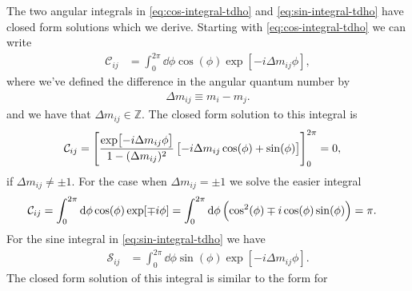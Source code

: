             The two angular integrals in \autoref{eq:cos-integral-tdho} and
            \autoref{eq:sin-integral-tdho} have closed form solutions which we
            derive.
            Starting with \autoref{eq:cos-integral-tdho} we can write
            \begin{align}
                \mathcal{C}_{ij}
                &=
                \int_{0}^{2\pi}
                \dd \phi
                \cos(\phi)
                \exp[-i\Delta m_{ij} \phi],
            \end{align}
            where we've defined the difference in the angular quantum number by
            \begin{align}
                \Delta m_{ij} \equiv m_i - m_j.
            \end{align}
            and we have that $\Delta m_{ij} \in \mathbb{Z}$.
            The closed form solution to this integral is
            \begin{align}
                \mathcal{C}_{ij}
                &= \left[ 
                    \frac{\exp[-i\Delta m_{ij} \phi]}{1 - (\Delta m_{ij})^2}
                    \left[ 
                        -i\Delta m_{ij} \cos(\phi)
                        + \sin(\phi)
                     \right]
                 \right]_{0}^{2\pi}
                = 0,
            \end{align}
            if $\Delta m_{ij} \neq \pm 1$.
            For the case when $\Delta m_{ij} = \pm 1$ we solve the easier
            integral
            \begin{align}
                \mathcal{C}_{ij}
                &=
                \int_{0}^{2\pi}
                \dd \phi
                \cos(\phi) \exp[\mp i\phi]
                =
                \int_{0}^{2\pi}
                \dd \phi
                \left( 
                    \cos^2(\phi)
                    \mp i\cos(\phi)\sin(\phi)
                 \right)
                = \pi.
            \end{align}
            For the sine integral in \autoref{eq:sin-integral-tdho} we have
            \begin{align}
                \mathcal{S}_{ij}
                &=
                \int_{0}^{2\pi}
                \dd\phi
                \sin(\phi)
                \exp[-i\Delta m_{ij} \phi].
            \end{align}
            The closed form solution of this integral is similar to the form for
